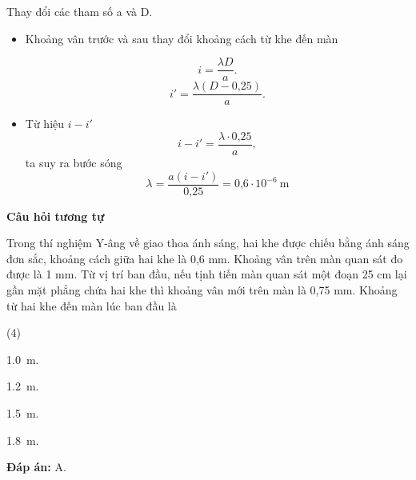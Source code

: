 \begin{dang}{Thay đổi các tham số a và D.}
{		\begin{itemize}
			\item Khoảng vân trước và sau thay đổi khoảng cách từ khe đến màn
			
			\begin{equation*}
				i=\dfrac{\lambda D}{a}.
			\end{equation*}
			\begin{equation*}
				i'=\dfrac{\lambda (D-\text{0,25})}{a}.
			\end{equation*}
			\item Từ hiệu $i-i'$ 
			\begin{equation*}
				i-i'=\dfrac{\lambda \cdot \text{0,25}}{a},
			\end{equation*}
			ta suy ra bước sóng
			\begin{equation*}
				\lambda = \dfrac{a(i-i')}{\text{0,25}}= \text {0,6} \cdot 10^{-6}\ \text{m}
			\end{equation*}
		\end{itemize}
		
		\begin{center}
			\textbf{Câu hỏi tương tự}
		\end{center}
		
		Trong thí nghiệm Y-âng về giao thoa ánh sáng, hai khe được chiếu bằng ánh sáng đơn sắc, khoảng cách giữa hai khe là 0,6 mm. Khoảng vân trên màn quan sát đo được là 1 mm. Từ vị trí ban đầu, nếu tịnh tiến màn quan sát một đoạn 25 cm lại gần mặt phẳng chứa hai khe thì khoảng vân mới trên màn là 0,75 mm. Khoảng từ hai khe đến màn lúc ban đầu là
		\begin{mcq}(4)
			\item  \SI{1,0}{\meter}.		
			\item  \SI{1,2}{\meter}.		
			\item  \SI{1,5}{\meter}.		
			\item  \SI{1,8}{\meter}.
		\end{mcq}
		
		\textbf{Đáp án:} A.
	}
\end{dang}

